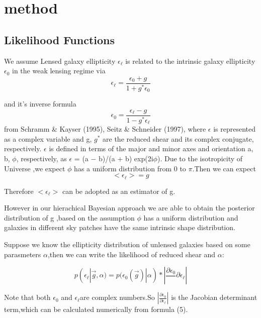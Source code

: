 \documentclass[useAMS,usenatbib]{mn2e}
\begin{document}
\section{method}
\label{sec:XXX}

\subsection{Likelihood Functions}

We assume Lensed galaxy ellipticity $\epsilon_{\ell}$ is related
to the intrinsic galaxy ellipticity $\epsilon_{0}$ in the weak lensing
regime via
\begin{equation}
\epsilon_{\ell}=\frac{\epsilon_{0}+g}{1+g^{*}\epsilon_{0}}
\end{equation}


and it's inverse formula 
\begin{equation}
\epsilon_{0}=\frac{\epsilon_{\ell}-g}{1-g^{*}\epsilon_{\ell}}
\end{equation}
from Schramm \& Kayser (1995), Seitz \& Schneider (1997), where $\epsilon$
is represented as a complex variable and g, $g^{*}$ are the reduced
shear and its complex conjugate, respectively. $\epsilon$ is defined
in terms of the major and minor axes and orientation a, b, $\phi$,
respectively, as $\epsilon$ = (a − b)/(a + b) exp(2i$\phi$). Due to the isotropicity
of Universe ,we expect $\phi$ has a uniform distribution from 0 to
$\pi$.Then we can expect 
\begin{equation}
<\epsilon_{\ell}>=g
\end{equation}


Therefore $<\epsilon_{\ell}>$ can be adopted as an estimator of g.

However in our hierachical Bayesian approach we are able to obtain
the posterior distribution of g ,based on the assumption  $\phi$ has a uniform distribution and galaxies in different
sky patches have the same intrinsic shape distribution.

Suppose we know the ellipticity distribution of unlensed galaxies
based on some parasmeters $\alpha$,then we can write the likelihood of reduced shear and $\alpha$:

\begin{equation}
p(\epsilon_{\ell}|\vec{g},\alpha)=p(\epsilon_{0}(\vec{g})|\alpha)*|\frac{\partial\epsilon_{0}}\,{\partial\epsilon_{\ell}}|
\end{equation}


Note that both $\epsilon_{0}$ and $\epsilon_{\ell}$are complex numbers.So
$|\frac{\partial\epsilon_{0}}{\partial\epsilon_{\ell}}|$ is the Jacobian
determinant term,which can be calculated numerically from formula
(5).
\end{document}
